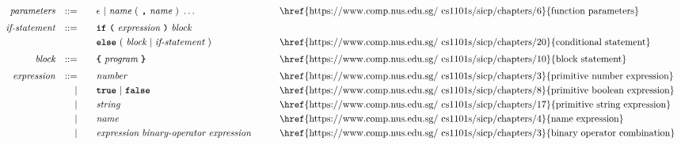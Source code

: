 \begin{alignat*}{9}
&& \textit{parameters}   && ::= &\quad &&  \epsilon\ | \  \textit{name} \ 
                                                   (\ \textbf{\texttt{,}} \ \textit{name}\ )\ \ldots
                                                            && \textrm{\href{https://www.comp.nus.edu.sg/~cs1101s/sicp/chapters/6}{function parameters}}   \\[1mm]
&& \textit{if-statement} && ::= &\quad &&  \textbf{\texttt{if}}\
                                   \textbf{\texttt{(}}\ \textit{expression} \ \textbf{\texttt{)}}\ 
                                   \textit{block} \\
&&                       &&     &      && \textbf{\texttt{else}}\
                                          (\ \textit{block}
                                          \ | \
                                          \textit{if-statement} \ )
                                                            && \textrm{\href{https://www.comp.nus.edu.sg/~cs1101s/sicp/chapters/20}{conditional statement}}   \\[1mm]
&& \textit{block}        && ::= &      && \textbf{\texttt{\{}}\  \textit{program}   \ \textbf{\texttt{\}}} \quad
                                                           && \textrm{\href{https://www.comp.nus.edu.sg/~cs1101s/sicp/chapters/10}{block statement}}\\[1mm]         
&& \textit{expression}   && ::= &\quad &&  \textit{number}   && \textrm{\href{https://www.comp.nus.edu.sg/~cs1101s/sicp/chapters/3}{primitive number expression}}\\
&&                       && |   &\quad && \textbf{\texttt{true}}\ |\ \textbf{\texttt{false}}
                                                           && \textrm{\href{https://www.comp.nus.edu.sg/~cs1101s/sicp/chapters/8}{primitive boolean expression}}\\
&&                       && |   &\quad &&  \textit{string}   && \textrm{\href{https://www.comp.nus.edu.sg/~cs1101s/sicp/chapters/17}{primitive string expression}}\\
&&                       && |   &\quad &&  \textit{name}   && \textrm{\href{https://www.comp.nus.edu.sg/~cs1101s/sicp/chapters/4}{name expression}}\\
&&                       && |   &\quad &&  \textit{expression} \  \textit{binary-operator} \ 
                                            \textit{expression} \qquad
                                                           && \textrm{\href{https://www.comp.nus.edu.sg/~cs1101s/sicp/chapters/3}{binary operator combination}}\\

\end{alignat*}
